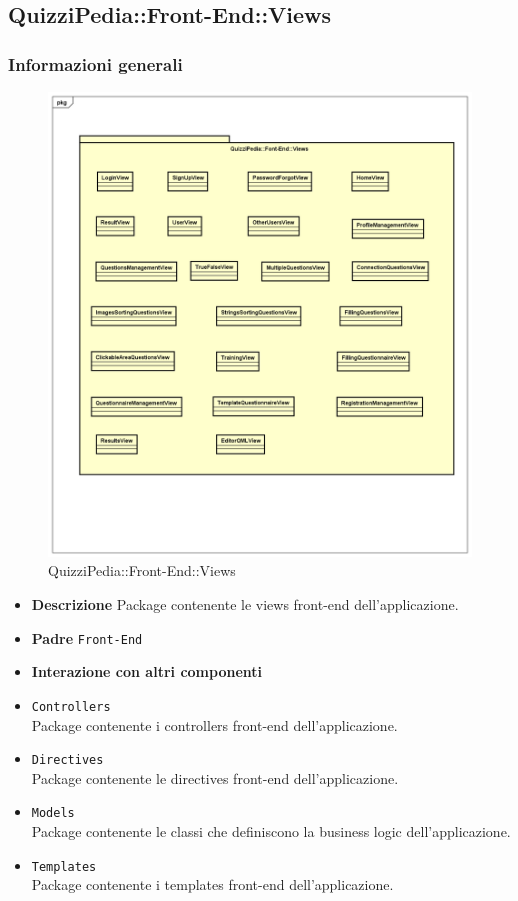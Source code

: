 \newpage

\subsection{QuizziPedia::Front-End::Views}
\subsubsection{Informazioni generali}
\label{QuizziPedia::Front-End}
\begin{figure}
	\centering
	\includegraphics[scale=0.45]{UML/Package/QuizziPedia_Front-End_View.png}
	\caption{QuizziPedia::Front-End::Views}
\end{figure}
\begin{itemize}
	\item \textbf{Descrizione}
	Package contenente le views front-end dell'applicazione.
	\item \textbf{Padre}
	\texttt{Front-End}
	\item \textbf{Interazione con altri componenti}
	\item \texttt{Controllers} \\ Package contenente i controllers front-end dell'applicazione.
	\item \texttt{Directives} \\ Package contenente le directives front-end dell'applicazione.
	\item \texttt{Models} \\ Package contenente le classi che definiscono la business logic dell'applicazione.
	\item \texttt{Templates} \\ Package contenente i templates front-end dell'applicazione.
\end{itemize}
